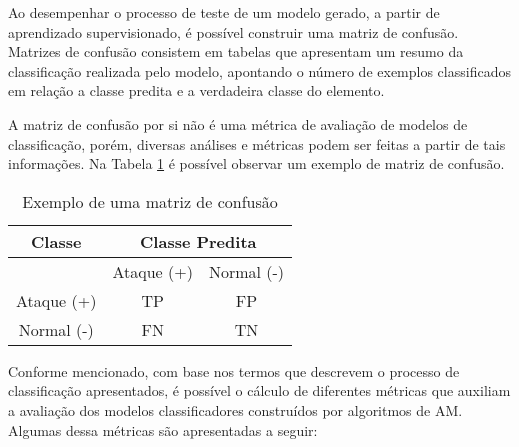 Ao desempenhar o processo de teste de um modelo gerado, a partir de aprendizado supervisionado, é possível construir uma matriz de confusão. Matrizes de confusão consistem em tabelas que apresentam um resumo da classificação realizada pelo modelo, apontando o número de exemplos classificados em relação a classe predita e a verdadeira classe do elemento.

A matriz de confusão por si não é uma métrica de avaliação de modelos de classificação, porém, diversas análises e métricas podem ser feitas a partir de tais informações. Na Tabela \ref{tab:matriz-confusao} é possível observar um exemplo de matriz de confusão.

\begin{table}[H]
    \centering
    \begin{tabular}{c||cc}
        \hline
        \textbf{Classe} & \multicolumn{2}{c}{\textbf{Classe Predita}} \\
        \hline
        \hline
        & Ataque (+) & Normal (-) \\
        Ataque (+) & TP & FP \\
        Normal (-) & FN & TN \\
        \hline
    \end{tabular}
    \caption{Exemplo de uma matriz de confusão}
    \label{tab:matriz-confusao}
\end{table}

Conforme mencionado, com base nos termos que descrevem o processo de classificação apresentados, é possível o cálculo de diferentes métricas que auxiliam a avaliação dos modelos classificadores construídos por algoritmos de AM. Algumas dessa métricas são apresentadas a seguir:

